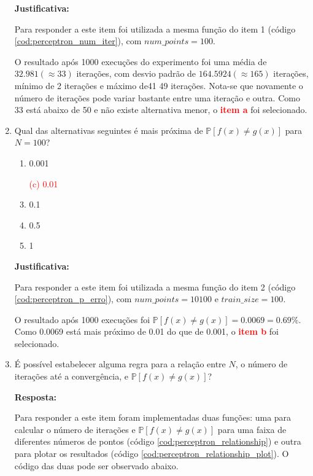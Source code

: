 \begin{enumerate}
    \par

    \textbf{Justificativa:}

    Para responder a este item foi utilizada a mesma função do item 1 (código \ref{cod:perceptron_num_iter}), com $num\_points = 100$. 
    
    O resultado após 1000 execuções do experimento foi uma média de $32.981 (\approx 33)$ iterações, com desvio padrão de $164.5924 (\approx 165)$ iterações, mínimo de 2 iterações e máximo de41 49 iterações. Nota-se que novamente o número de iterações pode variar bastante entre uma iteração e outra. Como 33 está abaixo de 50 e não existe alternativa menor, o \textcolor{red}{\textbf{item a}} foi selecionado. 
     

    \item Qual das alternativas seguintes é mais próxima de $\mathbb{P}[f(x) \neq g(x)]$ para $N = 100$?
    
    \begin{enumerate}
        \item 0.001
        \item[\textcolor{red}{(c)}]\textcolor{red}{0.01}\addtocounter{enumii}{1}
        \item 0.1
        \item 0.5
        \item 1
    \end{enumerate}

    \par

    \textbf{Justificativa:}

    Para responder a este item foi utilizada a mesma função do item 2 (código \ref{cod:perceptron_p_erro}), com $num\_points = 10100$ e $train\_size = 100$.

    O resultado após 1000 execuções foi  $\mathbb{P}[f(x) \neq g(x)] = 0.0069 = 0.69\%$. Como 0.0069 está mais próximo de 0.01 do que de 0.001, o \textcolor{red}{\textbf{item b}} foi selecionado. 
     
    
    \item  É possível estabelecer alguma regra para a relação entre $N$, o número de iterações até a convergência,
    e $\mathbb{P}[f(x) \neq g(x)]$?

    \par

    \textbf{Resposta:}

    Para responder a este item foram implementadas duas funções: uma para calcular o número de iterações e $\mathbb{P}[f(x) \neq g(x)]$ para uma faixa de diferentes números de pontos (código \ref{cod:perceptron_relationship}) e outra para plotar os resultados (código \ref{cod:perceptron_relationship_plot}). O código das duas pode ser observado abaixo.



\end{enumerate}
